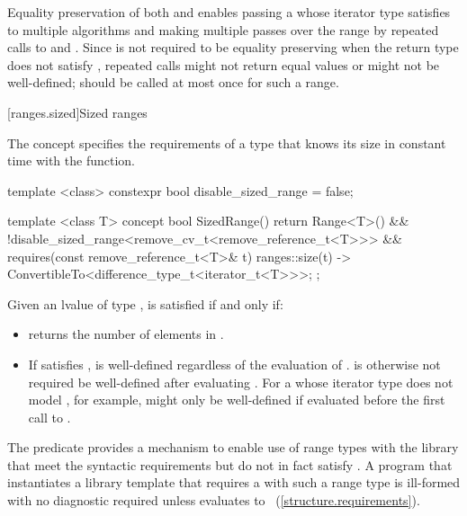 \pnum \enternote
Equality preservation of both  and  enables passing a 
whose iterator type satisfies 
to multiple algorithms and
making multiple passes over the range by repeated calls to  and .
Since  is not required to be equality preserving when the return type does
not satisfy , repeated calls might not return equal values or
might not be well-defined;  should be called at most once for such a range.
\exitnote

[ranges.sized]{Sized ranges}

\pnum
The  concept specifies the requirements
of a  type that knows its size in constant time with the
 function.

\begin{itemdecl}
template <class>
constexpr bool disable_sized_range = false;

template <class T>
concept bool SizedRange() {
  return Range<T>() &&
    !disable_sized_range<remove_cv_t<remove_reference_t<T>>> &&
    requires(const remove_reference_t<T>& t) {
      { ranges::size(t) } -> ConvertibleTo<difference_type_t<iterator_t<T>>>;
    };
}
\end{itemdecl}

\begin{itemdescr}
\pnum
Given an lvalue  of type ,  is satisfied if and only if:

\begin{itemize}
\item {} returns the number of elements in .
\item If  satisfies ,
 is well-defined regardless of the evaluation of
. \enternote {} is otherwise not required be
well-defined after evaluating . For a 
whose iterator type does not model , for
example,  might only be well-defined if evaluated before
the first call to . \exitnote
\end{itemize}

\pnum
\enternote The  predicate provides a mechanism to enable use
of range types with the library that meet the syntactic requirements but do
not in fact satisfy . A program that instantiates a library template
that requires a  with such a range type  is ill-formed with no
diagnostic required unless
 evaluates
to ~(\ref{structure.requirements}). \exitnote
\end{itemdescr}

